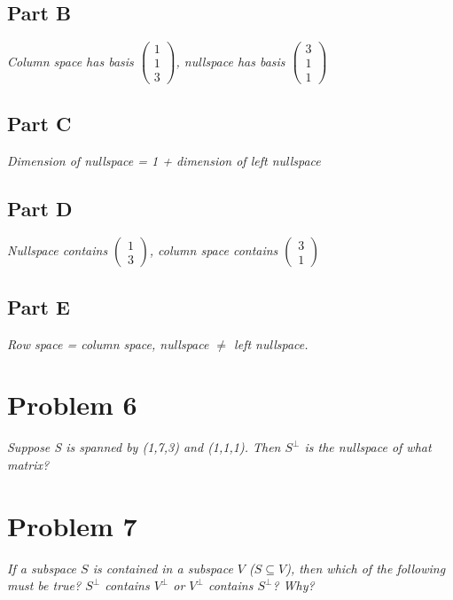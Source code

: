 \documentclass{article}
\begin{document}
\subsection*{Part B}

\textit{Column space has basis $\begin{pmatrix} 1\\1\\3
\end{pmatrix}$, nullspace has basis $\begin{pmatrix} 3\\1\\1
\end{pmatrix}$}

\subsection*{Part C}

\textit{Dimension of nullspace = 1 + dimension of left nullspace}

\subsection*{Part D}

\textit{Nullspace contains $\begin{pmatrix} 1\\3 \end{pmatrix}$, column space
contains $\begin{pmatrix} 3\\1 \end{pmatrix}$}

\subsection*{Part E}

\textit{Row space = column space, nullspace $\neq$ left nullspace.}

\section*{Problem 6}

\textit{Suppose S is spanned by (1,7,3) and (1,1,1). Then $S^\perp$ is the
nullspace of what matrix?}

\section*{Problem 7}

\textit{If a subspace $S$ is contained in a subspace $V$ ($S \subseteq V$),
then which of the following must be true? $S^\perp$ contains $V^\perp$ or
$V^\perp$ contains $S^\perp$? Why?}
\end{document}
